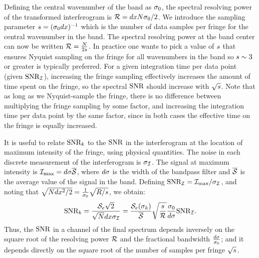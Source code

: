 Defining the central wavenumber of the band as $\sigma_0$, the spectral resolving power of the transformed interferogram is $\mathcal{R} = dx N\sigma_0/2$. We introduce the sampling parameter $s = (\sigma_0dx)^{-1}$ which is the number of data samples per fringe for the central wavenumber in the band. The spectral resolving power at the band center can now be written $\mathcal{R} = \frac{N}{2s}$.  In practice one wants to pick a value of $s$ that ensures Nyquist sampling on the fringe for all wavenumbers in the band so $s \sim 3$ or greater is typically preferred. For a given integration time per data point (given $\textrm{SNR}_{\mathcal{I}}$), increasing the fringe sampling effectively increases the amount of time spent on the fringe, so the spectral $\textrm{SNR}$ should increase with $\sqrt{s}$. Note that as long as we Nyquist-sample the fringe, there is no difference between multiplying the fringe sampling by some factor, and increasing the integration time per data point by the same factor, since in both cases the effective time on the fringe is equally increased.  %

It is useful to relate $\textrm{SNR}_k$ to the $\textrm{SNR}$ in the interferogram at the location of maximum intensity of the fringe, using physical quantities. The noise in each discrete measurement of the interferogram is $\sigma_{\mathcal{I}}$. The signal at maximum intensity is $\mathcal{I}_\textrm{max} = d\sigma\overline{\mathcal{S}}$, where $d\sigma$ is the width of the bandpass filter and $\overline{\mathcal{S}}$ is the average value of the signal in the band. Defining $\textrm{SNR}_{\mathcal{I}} = \mathcal{I}_\textrm{max}/\sigma_{\mathcal{I}}$, and noting that $\sqrt{Ndx^2/2} = \frac{1}{\sigma_0}\sqrt{R/s}$, we obtain:
\begin{equation}
\textrm{SNR}_k = \frac{\mathcal{S}_e\sqrt{2}}{\sqrt{N}dx\sigma_{\mathcal{I}}} = \frac{\mathcal{S}_e(\sigma_k)}{\overline{\mathcal{S}}}\sqrt{\frac{s}{\mathcal{R}}}\frac{ \sigma_0}{d\sigma} \textrm{SNR}_{\mathcal{I}} .
\label{eq:SNRratio}
\end{equation}
Thus, the $\textrm{SNR}$ in a channel of the final spectrum depends inversely on the square root of the resolving power $\mathcal{R}$ and the fractional bandwidth $\frac{d\sigma}{\sigma_0}$; and it depends directly on the square root of the number of samples per fringe $\sqrt{s}$. 


